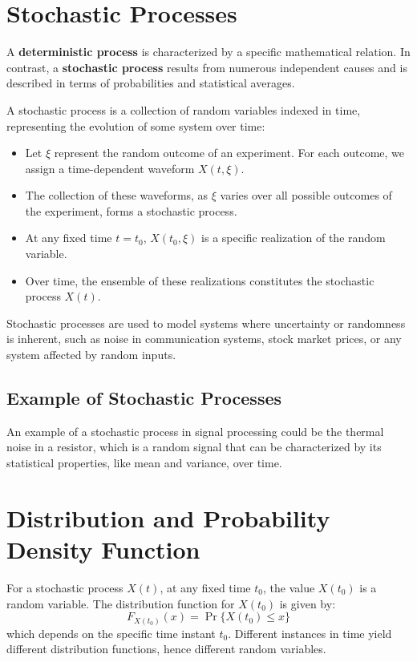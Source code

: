 \section*{Stochastic Processes}

A \textbf{deterministic process} is characterized by a specific mathematical relation. In contrast, a \textbf{stochastic process} results from numerous independent causes and is described in terms of probabilities and statistical averages.

A stochastic process is a collection of random variables indexed in time, representing the evolution of some system over time:
\begin{itemize}
    \item Let \( \xi \) represent the random outcome of an experiment. For each outcome, we assign a time-dependent waveform \( X(t, \xi) \).
    \item The collection of these waveforms, as \( \xi \) varies over all possible outcomes of the experiment, forms a stochastic process.
    \item At any fixed time \( t = t_0 \), \( X(t_0, \xi) \) is a specific realization of the random variable.
    \item Over time, the ensemble of these realizations constitutes the stochastic process \( X(t) \).
\end{itemize}

Stochastic processes are used to model systems where uncertainty or randomness is inherent, such as noise in communication systems, stock market prices, or any system affected by random inputs.

\subsection*{Example of Stochastic Processes}
An example of a stochastic process in signal processing could be the thermal noise in a resistor, which is a random signal that can be characterized by its statistical properties, like mean and variance, over time.

\section*{Distribution and Probability Density Function}

For a stochastic process \( X(t) \), at any fixed time \( t_0 \), the value \( X(t_0) \) is a random variable. The distribution function for \( X(t_0) \) is given by:
\[ F_{X(t_0)}(x) = \Pr\{X(t_0) \leq x\} \]
which depends on the specific time instant \( t_0 \). Different instances in time yield different distribution functions, hence different random variables.

